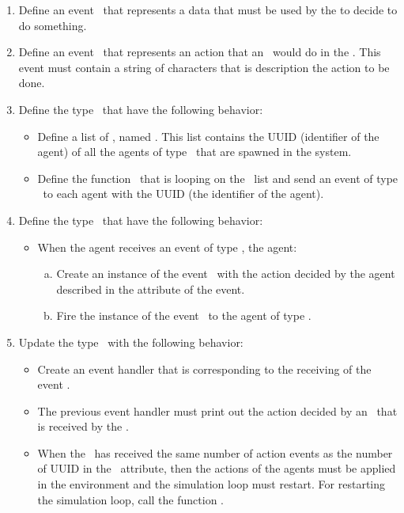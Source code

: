 \documentclass[english,nodocumentinfo,nopubpage]{utbmciadreport}
\begin{document}
\begin{enumerate}
\item Define an event \ that represents a data that must be used by the  to decide to do something.
\item Define an event \ that represents an action that an \ would do in the . This event must contain a string of characters that is description the action to be done.
\item Define the type \ that have the following behavior:
	\begin{itemize}
	\item Define a list of , named . This list contains the UUID (identifier of the agent) of all the agents of type \ that are spawned in the system.
	\item Define the function \ that is looping on the \ list and send an event of type \ to each agent with the UUID (the identifier of the agent).
	\end{itemize}
\item Define the type \ that have the following behavior:
	\begin{itemize}
	\item When the agent receives an event of type , the agent:
		\begin{enumerate}[a)]
		\item Create an instance of the event \ with the action decided by the agent described in the attribute of the event.
		\item Fire the instance of the event \ to the agent of type .
		\end{enumerate}
	\end{itemize}
\item Update the type \ with the following behavior:
	\begin{itemize}
	\item Create an event handler that is corresponding to the receiving of the event .
	\item The previous event handler must print out the action decided by an \ that is received by the .
	\item When the \ has received the same number of action events as the number of UUID in the \ attribute, then the actions of the agents must be applied in the environment and the simulation loop must restart. For restarting the simulation loop, call the function .

\end{itemize}
\end{enumerate}
\end{document}
